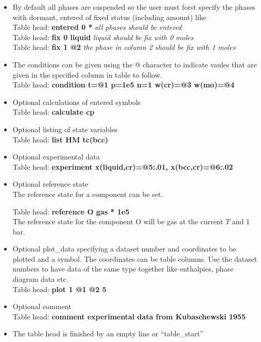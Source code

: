 \documentclass[11pt]{article}
\begin{document}
\begin{itemize}
\item By default all phases are suspended so the user must forst specify the
  phases with dormant, entered of fixed status (including amount) like\\
  Table head: {\bf entered 0 *} {\em all phases should be entered}\\ 
  Table head: {\bf fix 0 liquid} {\em liquid should be fix with 0 moles}\\ 
  Table head: {\bf fix 1 @2} {\em the phase in column 2 should be fix
    with 1 moles}

\item The conditions can be given using the @ character to indicate vaules
  that are given in the specified column in table to follow.\\
  Table head: {\bf condition t=@1 p=1e5 n=1 w(cr)=@3 w(mo)=@4 }

\item Optional calculations of entered symbols\\
  Table head: {\bf calculate cp}

\item Optional listing of state variables\\
  Table head: {\bf list HM tc(bcc)}

\item Optional experimental data\\
  Table head: {\bf experiment x(liquid,cr)=@5:.01, x(bcc,cr)=@6:.02}
      
\item Optional reference state\\
  The reference state for a component can be set.

  Table head: {\bf reference O gas * 1e5}\\ 
  The reference state for the component O will be gas at the current
  $T$ and 1 bar.

\item Optional plot\_data specifying a dataset number and coordinates
  to be plotted and a symbol.  The coordinates can be table columns.
  Use the dataset numbers to have data of the same type together like
  enthalpies, phase diagram data etc.\\
  Table head: {\bf plot 1 @1 @2 5}

\item Optional comment\\
  Table head: {\bf comment experimental data from Kubaschewski 1955}

\item The table head is finished by an empty line or ``table\_start''
\end{itemize}
  
\end{document}
